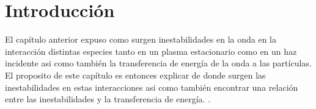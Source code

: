 \documentclass[../tesis_main_file.tex]{subfiles}
\begin{document}
\onlyinsubfile{\setcounter{chapter}{1}}
\section{Introducción}
El capítulo anterior expuso como surgen inestabilidades en la onda en la interacción distintas especies tanto en un plasma estacionario como en un haz incidente asi como también la transferencia de energía de la onda a las partículas.\\
El proposito de este capítulo es entonces explicar de donde surgen las inestabilidades en estas interacciones asi como también encontrar una relación entre las inestabilidades y la transferencia de energía. \cite{bellan2008fundamentals}.
\end{document}
